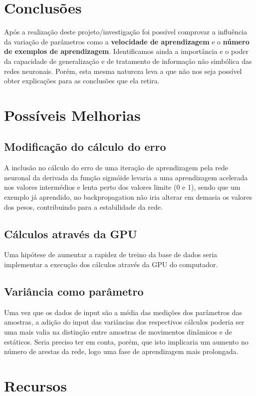 \documentclass[10pt,a4paper]{article}
\begin{document}
\section{Conclusões}

Após a realização deste projeto/investigação foi possível comprovar a influência da variação de parâmetros como a \textbf{velocidade de aprendizagem} e o \textbf{número de exemplos de aprendizagem}. Identificamos ainda a importância e o poder da capacidade de generalização e de tratamento de informação não simbólica das redes neuronais. Porém, esta mesma natureza leva a que não nos seja possível obter explicações para as conclusões que ela retira.

\section{Possíveis Melhorias}
\subsection{Modificação do cálculo do erro}
A inclusão no cálculo do erro de uma iteração de aprendizagem pela rede neuronal da derivada da função sigmóide levaria a uma aprendizagem acelerada nos valores intermédios e lenta perto dos valores limite (0 e 1), sendo que um exemplo já aprendido, no backpropagation não iria alterar em demasia os valores dos pesos, contribuindo para a estabilidade da rede. 

\subsection{Cálculos através da GPU}
Uma hipótese de aumentar a rapidez de treino da base de dados seria implementar a execução dos cálculos através da GPU do computador.

\subsection{Variância como parâmetro}
Uma vez que os dados de input são a média das medições dos parâmetros das amostras, a adição do input das variâncias dos respectivos cálculos poderia ser uma mais valia na distinção entre amostras de movimentos dinâmicos e de estáticos. Seria preciso ter em conta, porém, que isto implicaria um aumento no número de arestas da rede, logo uma fase de aprendizagem mais prolongada.

\section{Recursos}
\end{document}
